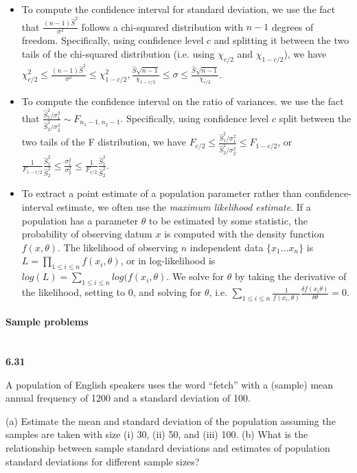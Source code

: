 \documentclass[11pt,letterpaper]{scrartcl}
\begin{document}
\begin{itemize}
\item To compute the confidence interval for standard deviation, we use the fact that $\frac{(n-1)\hat{S}^{2}}{\sigma^{2}}$ follows a chi-squared distribution with $n-1$ degrees of freedom.
Specifically, using confidence level $c$ and splitting it between the two tails of the chi-squared distribution (i.e. using $\chi_{c/2}$ and $\chi_{1-c/2}$), we have $\chi_{c/2}^{2} \leq \frac{(n-1)\hat{S}^{2}}{\sigma^{2}} \leq \chi_{1-c/2}^{2}, \frac{\hat{S}\sqrt{n-1}}{\chi_{1-c/2}} \leq \sigma \leq \frac{\hat{S}\sqrt{n-1}}{\chi_{c/2}}$. 
\item To compute the confidence interval on the ratio of variances. we use the fact that $\frac{\hat{S}_{1}^{2} / \sigma_{1}^{2}}{\hat{S}_{2}^{2} / \sigma_{2}^{2}} \sim F_{n_{1}-1, n_{2}-1}$.
Specifically, using confidence level $c$ split between the two tails of the F distribution, we have 
$F_{c/2} \leq \frac{\hat{S}_{1}^{2} / \sigma_{1}^{2}}{\hat{S}_{2}^{2} / \sigma_{2}^{2}} \leq F_{1-c/2}$, or $\frac{1}{F_{1-c/2}}\frac{\hat{S}_{1}^{2}}{\hat{S}_{2}^{2}} \leq \frac{\sigma_{1}^{2}}{\sigma_{2}^{2}} \leq \frac{1}{F_{c/2}}\frac{\hat{S}_{1}^{2}}{\hat{S}_{2}^{2}}$.
\item To extract a point estimate of a population parameter rather than confidence-interval estimate, we often use the \emph{maximum likelihood estimate}. 
If a population has a parameter $\theta$ to be estimated by some statistic, the probability of observing datum $x$ is computed with the density function $f(x, \theta)$. 
The likelihood of observing $n$ independent data $\{x_{1} ... x_{n}\}$ is $L=\prod_{1 \leq i \leq n} f(x_{i}, \theta)$, or in log-likelihood is $log(L) = \sum_{1 \leq i \leq n} log(f(x_{i}, \theta)$.
We solve for $\theta$ by taking the derivative of the likelihood, setting to 0, and solving for $\theta$, i.e. $\sum_{1 \leq i \leq n} \frac{1}{f(x_{i}, \theta)}\frac{\delta f(x_{i}\theta)}{\delta \theta} = 0$.
\end{itemize}

\paragraph{Sample problems} ~\\

\textbf{6.31}

A population of English speakers uses the word ``fetch'' with a (sample) mean annual frequency of 1200 and a standard deviation of 100. 

(a) Estimate the mean and standard deviation of the population assuming the samples are taken with size (i) 30, (ii) 50, and (iii) 100.
(b) What is the relationship between sample standard deviations and estimates of population standard deviations for different sample sizes?
\end{document}
